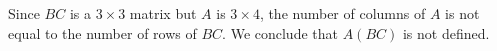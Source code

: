 \begin{example}

\item Since $BC$ is a $3 \times 3$ matrix but $A$ is $3 \times 4$, the number of columns of $A$ is not equal to the number of rows of $BC$. We conclude that $A(BC)$ is not defined.


\end{example}
